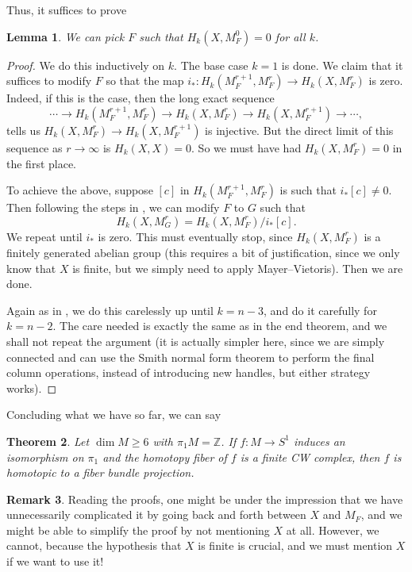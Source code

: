 \documentclass[a4paper, 12pt]{article}
\newtheorem{thm}{Theorem}[section]
\newtheorem{lemma}[thm]{Lemma}
\theoremstyle{definition}
\newtheorem{remark}[thm]{Remark}
\newcommand\Z{\mathbb{Z}}
\newcommand\fakeqed{\pushQED{\qed}\qedhere}
\begin{document}
Thus, it suffices to prove
\begin{lemma}
  We can pick $F$ such that $H_k(X, M_F^0) = 0$ for all $k$.
\end{lemma}

\begin{proof}
  We do this inductively on $k$. The base case $k = 1$ is done. We claim that it suffices to modify $F$ so that the map $i_*: H_k(M_F^{r + 1}, M_F^r) \to H_k(X, M_F^r)$ is zero. Indeed, if this is the case, then the long exact sequence
   \[
    \cdots \to H_k(M_F^{r + 1}, M_F^r) \to H_k(X, M_F^r) \to H_k(X, M_F^{r + 1}) \to \cdots,
  \]
  tells us $H_k(X, M_F^r) \to H_k(X, M_F^{r + 1})$ is injective. But the direct limit of this sequence as $r\to \infty$ is $H_k(X, X) = 0$. So we must have had $H_k(X, M_F^r) = 0$ in the first place.
 
  To achieve the above, suppose $[c]$ in $H_k(M_F^{r + 1}, M_F^r)$ is such that $i_* [c] \not= 0$. Then following the steps in , we can modify $F$ to $G$ such that
  \[
    H_k(X, M_G^r) = H_k(X, M_F^r)/i_*[c].
  \]
  We repeat until $i_*$ is zero. This must eventually stop, since $H_k(X, M_F^r)$ is a finitely generated abelian group (this requires a bit of justification, since we only know that $X$ is finite, but we simply need to apply Mayer--Vietoris). Then we are done.

  Again as in , we do this carelessly up until $k = n - 3$, and do it carefully for $k = n - 2$. The care needed is exactly the same as in the end theorem, and we shall not repeat the argument (it is actually simpler here, since we are simply connected and can use the Smith normal form theorem to perform the final column operations, instead of introducing new handles, but either strategy works).
\end{proof}

Concluding what we have so far, we can say
\begin{thm}
  Let $\dim M \geq 6$ with $\pi_1 M = \Z$. If $f: M \to S^1$ induces an isomorphism on $\pi_1$ and the homotopy fiber of $f$ is a finite CW complex, then $f$ is homotopic to a fiber bundle projection.\fakeqed
\end{thm}
\begin{remark}
  Reading the proofs, one might be under the impression that we have unnecessarily complicated it by going back and forth between $X$ and $M_F$, and we might be able to simplify the proof by not mentioning $X$ at all. However, we cannot, because the hypothesis that $X$ is finite is crucial, and we must mention $X$ if we want to use it!
\end{remark}


\end{document}
